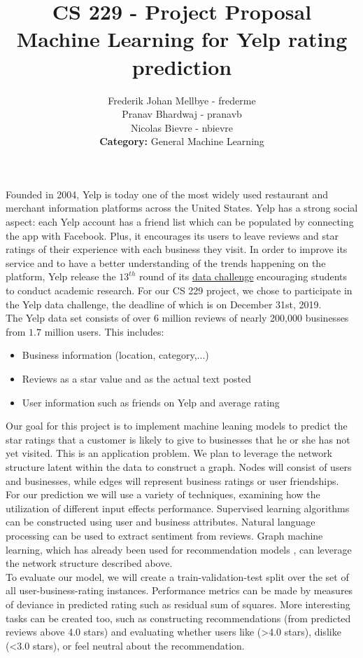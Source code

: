 \documentclass[letterpaper, 11pt]{article}
\title{CS 229 - Project Proposal \\ Machine Learning for Yelp rating prediction}
\author{Frederik Johan Mellbye - frederme\\Pranav Bhardwaj - pranavb\\Nicolas Bievre - nbievre\\\textbf{Category:} General Machine Learning}
\date{\vspace{1ex}}
\begin{document}
\maketitle

Founded in 2004, Yelp is today one of the most widely used restaurant and merchant information platforms across the United States. Yelp has a strong social aspect: each Yelp account has a friend list which can be populated by connecting the app with Facebook. Plus, it encourages its users to leave reviews and star ratings of their experience with each business they visit. In order to improve its service and to have a better understanding of the trends happening on the platform, Yelp release the $13^{th}$ round of its \href{https://www.yelp.com/dataset/challenge}{data challenge} encouraging students to conduct academic research. For our CS 229 project, we chose to participate in the Yelp data challenge, the deadline of which is on December 31st, 2019.\\

The Yelp data set consists of over $6$ million reviews of nearly 200,000 businesses from $1.7$ million users. This includes:
\begin{itemize}
    \item Business information (location, category,...)
    \item Reviews as a star value and as the actual text posted
    \item User information such as friends on Yelp and average rating
\end{itemize}

Our goal for this project is to implement machine leaning models to predict the star ratings that a customer is likely to give to businesses that he or she has not yet visited. This is an application problem. We plan to leverage the network structure latent within the data to construct a graph. Nodes will consist of users and businesses, while edges will represent business ratings or user friendships. \\

For our prediction we will use a variety of techniques, examining how the utilization of different input effects performance. Supervised learning algorithms can be constructed using user and business attributes. Natural language processing can be used to extract sentiment from reviews. Graph machine learning, which has already been used for recommendation models \cite{LI2013880}, can leverage the network structure described above. \\

To evaluate our model, we will create a train-validation-test split over the set of all user-business-rating instances. Performance metrics can be made by measures of deviance in predicted rating such as residual sum of squares. More interesting tasks can be created too, such as constructing recommendations (from predicted reviews above 4.0 stars) and evaluating whether users like (>4.0 stars), dislike (<3.0 stars), or feel neutral about the recommendation. 




\end{document}
